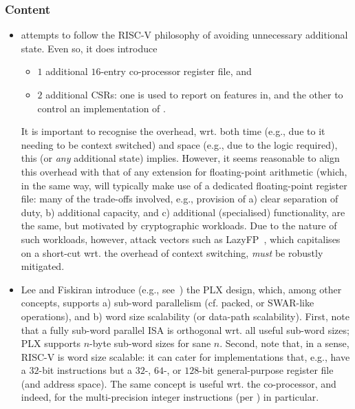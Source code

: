 
\subsubsection{Content}

\begin{itemize}

\item \ISE attempts to follow the RISC-V philosophy of avoiding unnecessary 
      additional state.  Even so, it does introduce

      \begin{itemize}
      \item $1$ additional $16$-entry co-processor register file,
            and
      \item $2$ additional CSRs: one is used to report on features in, and 
            the other to control an implementation of \ISE.
      \end{itemize}

      \noindent
      It is important to recognise 
      the overhead, wrt. both 
      time (e.g., due to it needing to be context switched) 
      and 
      space (e.g., due to the logic required),
      this (or {\em any} additional state) implies.
      However, it seems reasonable to align this overhead with that of any
      extension for floating-point arithmetic (which, in the same way, will
      typically make use of a dedicated floating-point register file: many 
      of the trade-offs involved, e.g., provision of
      a) clear separation of duty,
      b) additional capacity,
         and
      c) additional (specialised) functionality,
      are the same, but motivated by cryptographic workloads.
      Due to the nature of such workloads, however, attack vectors such as
      LazyFP~\cite{SCARV:StePre:18}, which capitalises on a short-cut wrt. 
      the overhead of context switching, {\em must} be robustly mitigated.

\item Lee and Fiskiran introduce (e.g., see~\cite{SCARV:LeeFis:05}) the PLX
      design, which, among other concepts, supports 
      a) sub-word parallelism (cf. packed, or SWAR-like operations),
         and
      b) word size scalability (or data-path scalability).
      First, 
      note that a fully sub-word parallel ISA is orthogonal wrt. all useful
      sub-word sizes; PLX supports $n$-byte sub-word sizes for sane $n$.
      Second,
      note that, in a sense, RISC-V is word size scalable: it can cater for
      implementations that, e.g., have a $32$-bit instructions but a $32$-,
      $64$-, or $128$-bit general-purpose register file (and address space).
      The same concept is useful wrt. the co-processor, and indeed, for the
      multi-precision integer instructions 
      (per )
      in particular.


\end{itemize}
